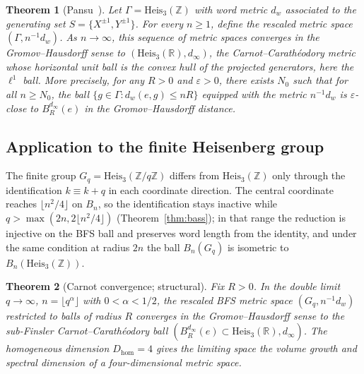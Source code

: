 \documentclass[11pt,a4paper]{article}
\newtheorem{theorem}{Theorem}[section]
\theoremstyle{definition}
\theoremstyle{remark}
\newcommand{\HeisR}{\mathrm{Heis}_3(\mathbb{R})}
\newcommand{\HeisZ}{\mathrm{Heis}_3(\mathbb{Z}/q\mathbb{Z})}
\newcommand{\HeisZZ}{\mathrm{Heis}_3(\mathbb{Z})}
\newcommand{\Gq}{G_q}
\newcommand{\Bn}{B_n}
\newcommand{\Dhom}{D_{\mathrm{hom}}}
\begin{document}
    \begin{theorem}[Pansu~\cite{Pansu1983}]
      \label{thm:pansu}
      Let $\Gamma = \HeisZZ$ with word metric $d_w$ associated to the generating set
      $S = \{X^{\pm 1}, Y^{\pm 1}\}$.
      For every $n \geq 1$, define the rescaled metric space
      $(\Gamma, n^{-1}d_w)$.
      As $n \to \infty$, this sequence of metric spaces converges in the Gromov--Hausdorff
      sense to $(\HeisR, d_\infty)$, the Carnot--Carath\'eodory metric whose horizontal unit ball is the convex hull of
      the projected generators, here the $\ell^1$ ball.
      More precisely, for any $R > 0$ and $\varepsilon > 0$, there exists $N_0$ such that
      for all $n \geq N_0$, the ball $\{g \in \Gamma : d_w(e,g) \leq nR\}$ equipped with
      the metric $n^{-1}d_w$ is $\varepsilon$-close to $B_R^{d_\infty}(e)$ in the
      Gromov--Hausdorff distance.
    \end{theorem}

  \subsection{Application to the finite Heisenberg group}

    The finite group $\Gq = \HeisZ$ differs from $\HeisZZ$ only through the identification
    $k \equiv k + q$ in each coordinate direction.
    The central coordinate reaches $\lfloor n^2/4\rfloor$ on $B_n$, so the identification stays inactive while
    $q > \max(2n, 2\lfloor n^2/4\rfloor)$ (Theorem~\ref{thm:bass}); in that range the reduction is injective on the
    BFS ball and preserves word length from the identity, and under the same condition at radius $2n$ the ball
    $\Bn(\Gq)$ is isometric to $\Bn(\HeisZZ)$.

    \begin{theorem}[Carnot convergence; structural]
      \label{thm:carnot}
      Fix $R > 0$.
      In the double limit $q \to \infty$, $n = \lfloor q^\alpha \rfloor$ with $0 < \alpha < 1/2$,
      the rescaled BFS metric space $(\Gq, n^{-1}d_w)$ restricted to balls of radius $R$
      converges in the Gromov--Hausdorff sense to the sub-Finsler Carnot--Car\-a\-th\'{e}o\-do\-ry
      ball $(B_R^{d_\infty}(e) \subset \HeisR, d_\infty)$.
      The homogeneous dimension $\Dhom = 4$ gives the limiting space the volume growth and
      spectral dimension of a four-dimensional metric space.
    \end{theorem}
\end{document}
